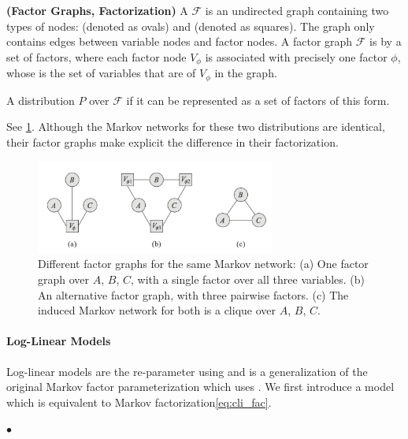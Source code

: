 \documentclass{article}
\newcommand{\bfs}[1]{\textbf{({#1}) }}
\begin{document}
\begin{defa}\bfs{Factor Graphs, Factorization}
A  $\mathcal{F}$ is an undirected graph containing two types of nodes:  (denoted as ovals) and  (denoted as squares). The graph only contains edges between variable nodes and factor nodes. A factor graph $\mathcal{F}$ is  by a set of factors, where each factor node $V_{\phi}$ is associated with precisely one factor $\phi$, whose  is the set of variables that are  of $V_{\phi}$ in the graph.

A distribution $P$  over $\mathcal{F}$ if it can be represented as a set of factors of this form.
\end{defa}
\begin{exma}
See \cref{fig:kldda}. Although the Markov networks for these two distributions are identical, their factor graphs make explicit the difference in their factorization.
\end{exma}
\begin{figure}[H]
    \centering
    \includegraphics[width=0.7\textwidth]{Figs/a18.png}
    \caption{Different factor graphs for the same Markov network: (a) One factor graph over $A$, $B$, $C$, with a single factor over all three variables. (b) An alternative factor graph, with three pairwise factors. (c) The induced Markov network for both is a clique over $A$, $B$, $C$.}
    \label{fig:kldda}
\end{figure}
\paragraph{Log-Linear Models}\label{sec:loglinearmodel}
Log-linear models are the re-parameter using  and is a generalization of the original Markov factor parameterization which uses . We first introduce a  model which is equivalent to Markov factorization\cref{eq:cli_fac}.

$\bullet$  
\end{document}
